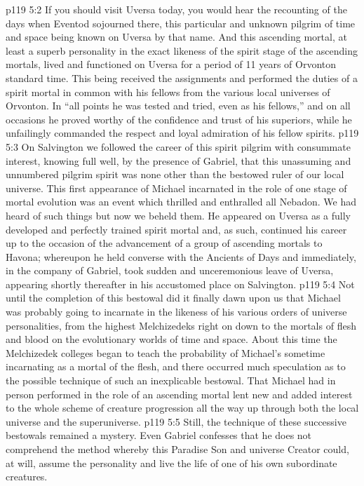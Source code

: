 \vs p119 5:2 If you should visit Uversa today, you would hear the recounting of the days when Eventod sojourned there, this particular and unknown pilgrim of time and space being known on Uversa by that name. And this ascending mortal, at least a superb personality in the exact likeness of the spirit stage of the ascending mortals, lived and functioned on Uversa for a period of 11 years of Orvonton standard time. This being received the assignments and performed the duties of a spirit mortal in common with his fellows from the various local universes of Orvonton. In “all points he was tested and tried, even as his fellows,” and on all occasions he proved worthy of the confidence and trust of his superiors, while he unfailingly commanded the respect and loyal admiration of his fellow spirits.
\vs p119 5:3 On Salvington we followed the career of this spirit pilgrim with consummate interest, knowing full well, by the presence of Gabriel, that this unassuming and unnumbered pilgrim spirit was none other than the bestowed ruler of our local universe. This first appearance of Michael incarnated in the role of one stage of mortal evolution was an event which thrilled and enthralled all Nebadon. We had heard of such things but now we beheld them. He appeared on Uversa as a fully developed and perfectly trained spirit mortal and, as such, continued his career up to the occasion of the advancement of a group of ascending mortals to Havona; whereupon he held converse with the Ancients of Days and immediately, in the company of Gabriel, took sudden and unceremonious leave of Uversa, appearing shortly thereafter in his accustomed place on Salvington.
\vs p119 5:4 \pc Not until the completion of this bestowal did it finally dawn upon us that Michael was probably going to incarnate in the likeness of his various orders of universe personalities, from the highest Melchizedeks right on down to the mortals of flesh and blood on the evolutionary worlds of time and space. About this time the Melchizedek colleges began to teach the probability of Michael’s sometime incarnating as a mortal of the flesh, and there occurred much speculation as to the possible technique of such an inexplicable bestowal. That Michael had in person performed in the role of an ascending mortal lent new and added interest to the whole scheme of creature progression all the way up through both the local universe and the superuniverse.
\vs p119 5:5 Still, the technique of these successive bestowals remained a mystery. Even Gabriel confesses that he does not comprehend the method whereby this Paradise Son and universe Creator could, at will, assume the personality and live the life of one of his own subordinate creatures.
